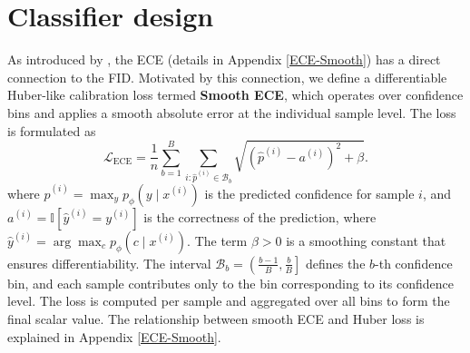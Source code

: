 \documentclass{article}
\newcommand{\todoa}[2][]{\todo[size=tiny,color=blue!20!white,#1]{GA: #2}\xspace}
\begin{document}










\section{Classifier design}

As introduced by \cite{ma2023elucidating}, the ECE (details in Appendix \ref{ECE-Smooth})  has a direct connection to the FID. Motivated by this connection, we define a differentiable Huber-like calibration loss termed \textbf{Smooth ECE}, which operates over confidence bins and applies a smooth absolute error at the individual sample level. The loss is formulated as
\begin{equation}
    \mathcal{L}_{\mathrm{ECE}} 
    = \frac{1}{n} \sum_{b=1}^{B} \sum_{i: \hat{p}^{(i)} \in \mathcal{B}_b} 
    \sqrt{ \left( \hat{p}^{(i)} - a^{(i)} \right)^2 + \beta }.
\end{equation}
where $\hat{p}^{(i)} = \max_{y} p_\phi(y \mid x^{(i)})$ is the predicted confidence for sample $i$, and $a^{(i)} = \mathbb{I}[\hat{y}^{(i)} = y^{(i)}]$ is the correctness of the prediction, where $\hat{y}^{(i)} = \arg\max_c p_\phi(c \mid x^{(i)})$. The term $\beta > 0$ is a smoothing constant that ensures differentiability. The interval $\mathcal{B}_b = \left( \frac{b-1}{B}, \frac{b}{B} \right]$ defines the $b$-th confidence bin, and each sample contributes only to the bin corresponding to its confidence level. The loss is computed per sample and aggregated over all bins to form the final scalar value. The relationship between smooth ECE and Huber loss is explained in Appendix \ref{ECE-Smooth}.
\end{document}
